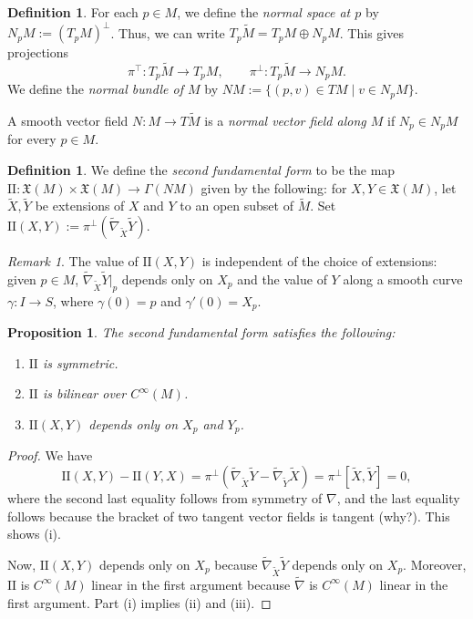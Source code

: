 \documentclass{amsart}[]
\newcommand{\why}{\color{red}(why?)\color{black}}
\theoremstyle{plain}
\newtheorem{proposition}[theorem]{Proposition}
\theoremstyle{definition}
\newtheorem{definition}[theorem]{Definition}
\theoremstyle{remark}
\newtheorem{remark}[theorem]{Remark}
\begin{document}
	\begin{definition}
		For each $p \in M$, we define the \emph{normal space at $p$} by $N_p M := (T_p M)^\perp$. Thus, we can write $T_p \widetilde M = T_p M \oplus N_p M$. This gives projections 
		$$\pi^\top: T_p \widetilde M \rightarrow T_p M,\qquad \pi^\perp: T_p \widetilde M \rightarrow N_p M.$$
		We define the \emph{normal bundle of $M$} by 
		$NM := \{(p,v) \in TM \mid v \in N_p M\}.$
		
		A smooth vector field $N:M \rightarrow T\widetilde M$ is a \emph{normal vector field along $M$} if $N_p \in N_p M$ for every $p \in M$. 
	\end{definition}

	\begin{definition}
		We define the \emph{second fundamental form} to be the map 
		$\mathrm{II}:\mathfrak X(M) \times \mathfrak X(M) \rightarrow \Gamma(NM)$ given by the following: for $X,Y \in \mathfrak X(M)$, let $\widetilde X, \widetilde Y$ be extensions of $X$ and $Y$ to an open subset of $\widetilde M$. Set $\mathrm{II}(X,Y) := \pi^\perp(\widetilde \nabla_{\widetilde X}\widetilde Y).$
	\end{definition}
	
	\begin{remark}
		The value of $\mathrm{II}(X,Y)$ is independent of the choice of extensions: given $p \in M$, $\widetilde \nabla_{\widetilde X}\widetilde Y|_p$ depends only on $X_p$ and the value of $Y$ along a smooth curve $\gamma:I \rightarrow S$, where $\gamma(0) = p$ and $\gamma'(0) = X_p$.
 	\end{remark}
 
 	\begin{proposition}
 		The second fundamental form satisfies the following:
 		\begin{enumerate}[\normalfont (i)]
 			\item $\mathrm{II}$ is symmetric.
 			\item $\mathrm{II}$ is bilinear over $C^\infty(M)$.
 			\item $\mathrm{II}(X,Y)$ depends only on $X_p$ and $Y_p$.
 		\end{enumerate}
 	\end{proposition}
 	\begin{proof}
 		We have 
 		$$\mathrm{II}(X,Y) - \mathrm{II}(Y,X) = \pi^\perp( \widetilde \nabla_{\widetilde X} \widetilde Y - \widetilde \nabla_{\widetilde Y} \widetilde X) = \pi^\perp[\widetilde X, \widetilde Y] = 0,$$
 		where the second last equality follows from symmetry of $\nabla$, and the last equality follows because the bracket of two tangent vector fields is tangent \why. This shows (i).
 		
 		Now, $\mathrm{II}(X,Y)$ depends only on $X_p$ because $\widetilde\nabla_{\widetilde X}\widetilde Y$ depends only on $X_p$. Moreover, $\mathrm{II}$ is $C^\infty(M)$ linear in the first argument because $\widetilde \nabla$ is $C^\infty(M)$ linear in the first argument. Part (i) implies (ii) and (iii).
 	\end{proof}
 
\end{document}
